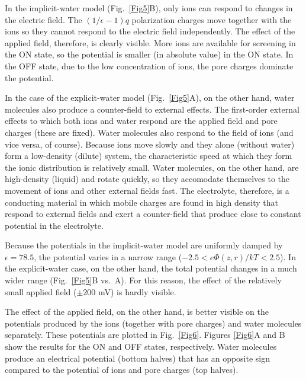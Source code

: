 \documentclass[fleqn,10pt]{SelfArx} %
\begin{document}
In the implicit-water model (Fig.\ \ref{Fig5}B), only ions can respond to changes in the electric field.
The $(1/\epsilon -1)q$ polarization charges move together with the ions so they cannot respond to the electric field independently.
The effect of the applied field, therefore, is clearly visible.
More ions are available for screening in the ON state, so the potential is smaller (in absolute value) in the ON state.
In the OFF state, due to the low concentration of ions, the pore charges dominate the potential.

In the case of the explicit-water model (Fig.\ \ref{Fig5}A), on the other hand, water molecules also produce a counter-field to external effects.
The first-order external effects to which both ions and water respond are the applied field and pore charges (these are fixed).
Water molecules also respond to the field of ions (and vice versa, of course).
Because ions move slowly and they alone (without water) form a low-density (dilute) system, the characteristic speed at which they form the ionic distribution is relatively small.
Water molecules, on the other hand, are high-density (liquid) and rotate quickly, so they accomodate themselves to the movement of ions and other external fields fast.
The electrolyte, therefore, is a conducting material in which mobile charges are found in high density that respond to external fields and exert a counter-field that produce close to constant potential in the electrolyte.

\begin{figure*}[t]
 \begin{center}
 \end{center}
\caption{The two components of the electrical potential of free charges as obtained from MD: potential of the ions and the fixed pore charges (top halves) and potential of water (bottom halves). Results are shown for the ON (panel A) and OFF (panel B) signs of the voltage.}
\label{Fig6}
\end{figure*} 


Because the potentials in the implicit-water model are uniformly damped by $\epsilon=78.5$, the potential varies in a narrow range ($-2.5<e\Phi (z,r)/kT<2.5$).
In the explicit-water case, on the other hand, the total potential changes in a much wider range (Fig.\ \ref{Fig5}B vs.\ A).
For this reason, the effect of the relatively small applied field ($\pm 200$ mV) is hardly visible.


The effect of the applied field, on the other hand, is better visible on the potentials produced by the ions (together with pore charges) and water molecules separately.
These potentials are plotted in Fig.\ \ref{Fig6}.
Figures \ref{Fig6}A and B show the results for the ON and OFF states, respectively.
Water molecules produce an electrical potential (bottom halves) that has an opposite sign compared to the potential of ions and pore charges (top halves).
\end{document}
